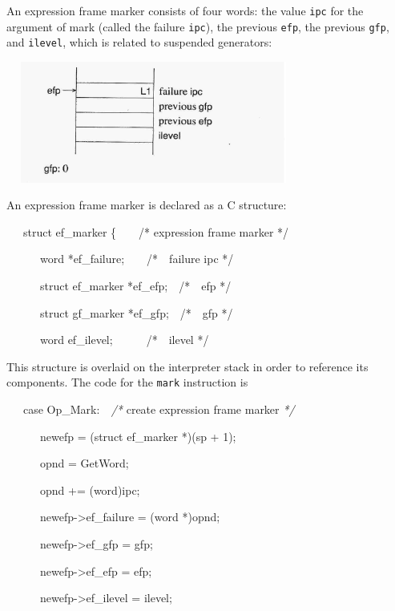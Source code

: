 An expression frame marker consists of four words: the value
\texttt{ipc} for the argument of mark (called the failure
\texttt{ipc}), the previous \texttt{efp}, the previous \texttt{gfp},
and \texttt{ilevel}, which is related to suspended generators:


\ \  \includegraphics[width=3.5272in,height=1.5689in]{ib-img/ib-img062.jpg} 


An expression frame marker is declared as a C structure:

{\ttfamily\mdseries
\ \ \ struct ef\_marker \{\ \ \ \ /* expression frame marker */}

{\ttfamily\mdseries
\ \ \ \ \ \ word *ef\_failure;\ \ \ \ /*\ \ failure ipc */}

{\ttfamily\mdseries
\ \ \ \ \ \ struct ef\_marker *ef\_efp;\ \ /*\ \ efp */}

{\ttfamily\mdseries
\ \ \ \ \ \ struct gf\_marker *ef\_gfp;\ \ /*\ \ gfp */}

{\ttfamily\mdseries
\ \ \ \ \ \ word ef\_ilevel;\ \ \ \ \ \ /*\ \ ilevel */}


This structure is overlaid on the interpreter stack in order to
reference its components. The code for the \texttt{mark} instruction
is

{\ttfamily\mdseries
\ \ \ case Op\_Mark:\textit{\ \ /* }create expression frame marker \textit{*/}}

{\ttfamily\mdseries
\ \ \ \ \ \ newefp = (struct ef\_marker *)(sp + 1);}

{\ttfamily\mdseries
\ \ \ \ \ \ opnd = GetWord;}

{\ttfamily\mdseries
\ \ \ \ \ \ opnd += (word)ipc;}

{\ttfamily\mdseries
\ \ \ \ \ \ newefp-{\textgreater}ef\_failure = (word *)opnd;}

{\ttfamily\mdseries
\ \ \ \ \ \ newefp-{\textgreater}ef\_gfp = gfp;}

{\ttfamily\mdseries
\ \ \ \ \ \ newefp-{\textgreater}ef\_efp = efp;}

{\ttfamily\mdseries
\ \ \ \ \ \ newefp-{\textgreater}ef\_ilevel = ilevel;}

